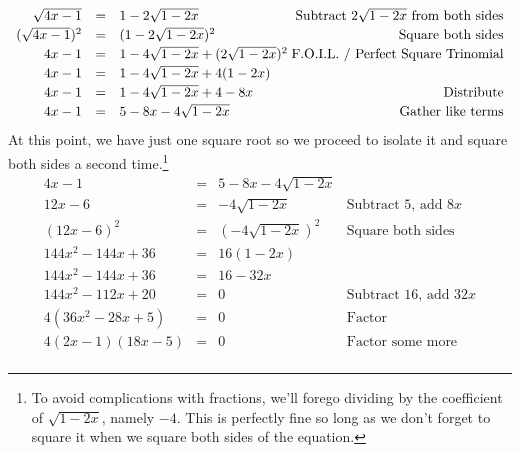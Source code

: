 \documentclass{ximera}
\begin{document}
\begin{example}
\begin{enumerate}
\[\begin{array}{rclr}
\sqrt{4x-1} & = & 1 - 2\sqrt{1-2x} & \hspace*{-.1in} \text{Subtract $2\sqrt{1 - 2x}$ from both sides} \\[2pt]

(\sqrt{4x-1})^2 & = & (1 - 2\sqrt{1-2x})^2 & \text{Square both sides} \\[2pt]

4x - 1 & = & 1 - 4\sqrt{1-2x} + (2\sqrt{1-2x})^2 & \hspace*{-.1in} \text{F.O.I.L. / Perfect Square Trinomial} \\[2pt]

4x - 1 & = & 1 - 4\sqrt{1-2x} + 4(1-2x) & \\[2pt]

4x - 1 & = & 1 - 4\sqrt{1-2x} + 4 - 8x & \text{Distribute} \\ [2pt]

4x - 1 & = & 5 - 8x - 4\sqrt{1-2x} & \text{Gather like terms} \\ \end{array} \] At this point, we have just one square root so we proceed to isolate it and square both sides a second time.\footnote{To avoid complications with fractions, we'll forego dividing by the coefficient of $\sqrt{1-2x}$, namely $-4$. This is perfectly fine so long as we don't forget to square it when we square both sides of the equation.} \[ \begin{array}{rclr}

4x - 1 & = & 5 - 8x - 4\sqrt{1-2x} &  \\ [2pt]

12x - 6 & = & -4\sqrt{1-2x} & \text{Subtract $5$, add $8x$}\\ [2pt]

(12x-6)^2 & = & (-4\sqrt{1-2x})^2 & \text{Square both sides} \\[2pt]

144x^2 - 144x + 36 & = & 16(1-2x) & \\ [2pt]

144x^2 -  144x + 36 & = & 16 - 32x & \\[2pt]

144x^2 - 112x + 20 & = & 0 & \text{Subtract $16$, add $32x$} \\[2pt]

4(36x^2 - 28x + 5) & = & 0 & \text{Factor} \\[2pt]

4(2x-1)(18x - 5) & = & 0 & \text{Factor some more} \\


\end{array}\]
\end{enumerate}
\end{example}
\end{document}
